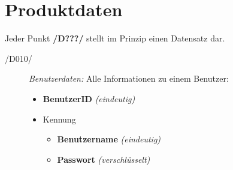 \section{Produktdaten}


Jeder Punkt \textbf{/D???/} stellt im Prinzip einen Datensatz dar.

\begin{description}
  \item[/D010/]
    \textit{Benutzerdaten:} Alle Informationen zu einem Benutzer:
    \begin{itemize}
      \item \textbf{BenutzerID} \textit{(eindeutig)}
      \item Kennung
        \begin{itemize}
          \item \textbf{Benutzername} \textit{(eindeutig)}
          \item \textbf{Passwort} \textit{(verschlüsselt)}
        \end{itemize}
    \end{itemize}
\end{description}

